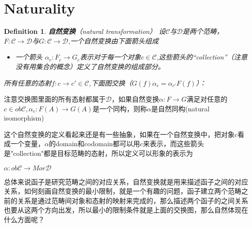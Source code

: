 \documentclass[UTF8,11pt,a4paper]{ctexart}
\newtheorem{definition}[theorem]{Definition}
\begin{document}
\section{Naturality}
\begin{definition}

\textbf{自然变换}（natural transformation）
设$\mathcal{C}$与$\mathcal{D}$是两个范畴，$F \colon \mathcal{C}\rightarrow \mathcal{D}$与$G \colon \mathcal{C} \rightarrow \mathcal{D}$,一个自然变换由下面箭头组成
\begin{itemize}
	\item 一个箭头 $\alpha_c \colon F_c \rightarrow G_c$表示对于每一个对象$c \in \mathcal{C}$,这些箭头的“collection”（注意没有用集合的概念）定义了自然变换的组成部分。
\end{itemize}
所有任意的态射$f \colon c \rightarrow c' \in \mathcal{C}$,下面图交换（$G(f)\alpha_{c}=\alpha_{c'}F(f)$）：
\begin{center}
\end{center}

\end{definition}
注意交换图里面的所有态射都属于$\mathcal{D}$，如果自然变换$\alpha \colon F \rightarrow G$满足对任意的$c \in ob\mathcal{C} , \alpha_{c}:F(A) \rightarrow G(A)$是一个同构，则称$\alpha$是$\textbf{自然同构}$(natural isomorphism) 

这个自然变换的定义看起来还是有一些抽象，如果在一个自然变换中，把对象$c$看成一个变量，$\alpha$的domain和codomain都可以用$c$来表示，而这些箭头是"collection"都是目标范畴的态射，所以定义可以形象的表示为
\begin{center}
$\alpha \colon ob\mathcal{C} \rightarrow Mor\mathcal{D}$
\end{center}

总体来说函子是研究范畴之间的对应关系，自然变换就是用来描述函子之间的对应关系，如何刻画自然变换的最小限制，就是一个有趣的问题，函子建立两个范畴之前的关系是通过范畴间对象和态射的映射来完成的，那么描述两个函子的之间关系也要从这两个方向出发，所以最小的限制条件就是上面的交换图，那么自然体现在什么方面呢？
\end{document}
